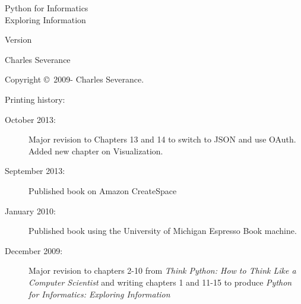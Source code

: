 



\newtheorem{ex}{Exercise}[chapter]

\begin{latexonly}

\renewcommand{\blankpage}{\thispagestyle{empty} \quad \newpage}

\thispagestyle{empty}

\begin{flushright}
\vspace*{2.0in}

\begin{spacing}{3}
{\huge Python for Informatics}\\
{\Large Exploring Information}
\end{spacing}

\vspace{0.25in}

Version \theversion

\vspace{0.5in}


{\Large
Charles Severance\\
}

\vfill

\end{flushright}

\pagebreak
\thispagestyle{empty}

{\small
Copyright \copyright ~2009- Charles Severance.


Printing history:

\begin{description}

\item[October 2013:] Major revision to Chapters 13 and 14
to switch to JSON and use OAuth.
Added new chapter on Visualization.

\item[September 2013:] Published book on Amazon CreateSpace

\item[January 2010:] Published book using the University of 
Michigan Espresso Book machine.

\item[December 2009:] Major revision to chapters 2-10 from
\emph{Think Python: How to Think Like
a Computer Scientist}
and writing chapters 1 and 11-15 to
produce 
\emph{Python for Informatics: Exploring Information}


\end{description}}
\end{latexonly}
